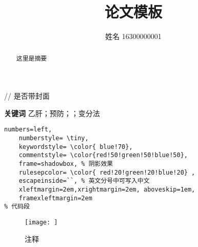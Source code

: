 \documentclass[UTF8,a4paper,12pt]{ctexart}%
\title{论文模板}
\author{姓名 16300000001}
\date{}
\begin{document}
	   // 是否带封面

\begin{abstract}
	这里是摘要
\end{abstract}
\noindent{}\textbf{关键词}\quad{} 乙肝；预防；；变分法

\tableofcontents %
\setcounter{page}{0}
\thispagestyle{empty}
\begin{lstlisting}[title=Myfile, frame=shadowbox]
 numbers=left, 
    numberstyle= \tiny, 
    keywordstyle= \color{ blue!70},
    commentstyle= \color{red!50!green!50!blue!50}, 
    frame=shadowbox, % 阴影效果
    rulesepcolor= \color{ red!20!green!20!blue!20} ,
    escapeinside=``, % 英文分号中可写入中文
    xleftmargin=2em,xrightmargin=2em, aboveskip=1em,
    framexleftmargin=2em
% 代码段
\end{lstlisting}

  \begin{center}
  \begin{figure}
  	\centering
  	\texttt{[image:  ]}
  	\caption{注释}
  	\label{fig1}
  \end{figure}
  \end{center}
  
\end{document}
